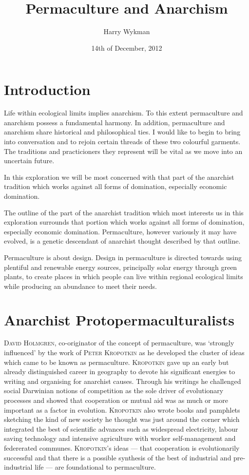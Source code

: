 \documentclass[a4paper, 11pt]{article}
\begin{document}
\title{Permaculture and Anarchism}
\author{Harry Wykman}
\date{14th of December, 2012}
\maketitle
\begin{multicols*}{2}

\section*{Introduction}
Life within ecological limits implies anarchism.  To this extent permaculture and anarchism possess a fundamental harmony.  In addition, permaculture and anarchism share historical and philosophical ties.  I would like to begin to bring into conversation and to rejoin certain threads of these two colourful garments.  The traditions and practicioners they represent will be vital as we move into an uncertain future.

In this exploration we will be most concerned with that part of the anarchist tradition which works against all forms of domination, especially economic domination.

The outline of the part of the anarchist tradition which most interests us in this exploration surrounds that portion which works against all forms of domination, especially economic domination.  Permaculture, however variously it may have evolved, is a genetic descendant of anarchist thought described by that outline.

Permaculture is about design.  Design in permaculture is directed towards using plentiful and renewable energy sources, principally solar energy through green plants, to create places in which people can live within regional ecological limits while producing an abundance to meet their needs.

\section*{Anarchist Protopermaculturalists}
 \textsc{David Holmgren}, co-originator of the concept of permaculture, was `strongly influenced' by the work of \textsc{Peter Kropotkin} as he developed the cluster of ideas which came to be known as permaculture.  \textsc{Kropotkin} gave up an early but already distinguished career in geography to devote his significant energies to writing and organising for anarchist causes. Through his writings he challenged social Darwinian notions of competition as the sole driver of evolutionary processes and showed that cooperation or mutual aid was as much or more important as a factor in evolution.  \textsc{Kropotkin} also wrote books and pamphlets sketching the kind of new society he thought was just around the corner which integrated the best of scientific advances such as widespread electricity, labour saving technology and intensive agriculture with worker self-management and federerated communes.  \textsc{Kropotkin}'s ideas --- that cooperation is evolutionarily successful and that there is a possible synthesis of the best of industrial and pre-industrial life --- are foundational to permaculture.


\end{multicols*}
\end{document}

